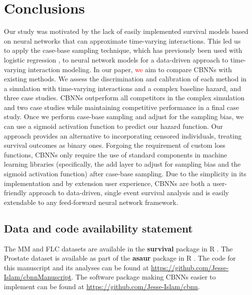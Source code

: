 \documentclass[preprint,12pt,authoryear]{elsarticle}
\begin{document}
\section{Conclusions}\label{sec5}

Our study was motivated by the lack of easily implemented survival models based on neural networks that can approximate time-varying interactions. This led us to apply the case-base sampling technique, which has previously been used with logistic regression \citep{hanley2009}, to neural network models for a data-driven approach to time-varying interaction modeling. In our paper, \textcolor{red}{we} aim to compare CBNNs with existing methods. We assess the discrimination and calibration of each method in a simulation with time-varying interactions and a complex baseline hazard, and three case studies. CBNNs outperform all competitors in the complex simulation and two case studies while maintaining competitive performance in a final case study. Once we perform case-base sampling and adjust for the sampling bias, we can use a sigmoid activation function to predict our hazard function. Our approach provides an alternative to incorporating censored individuals, treating survival outcomes as binary ones. Forgoing the requirement of custom loss functions, CBNNs only require the use of standard components in machine learning libraries (specifically, the add layer to adjust for sampling bias and the sigmoid activation function) after case-base sampling. Due to the simplicity in its implementation and by extension user experience, CBNNs are both a user-friendly approach to data-driven, single event survival analysis and is easily extendable to any feed-forward neural network framework.



\hypertarget{data-and-code-availability-statement}{%
\subsection*{Data and code availability
statement}\label{data-and-code-availability-statement}}


The MM and FLC datasets are available in the \textbf{survival} package in R
\citep{survpkg}. The Prostate dataset is available as part of the \textbf{asaur} package in R \citep{asaur}.
The code for this manuscript and its analyses can be found at \url{https://github.com/Jesse-Islam/cbnnManuscript}. The software package making CBNNs easier to implement can be found at \url{https://github.com/Jesse-Islam/cbnn}.
\end{document}

